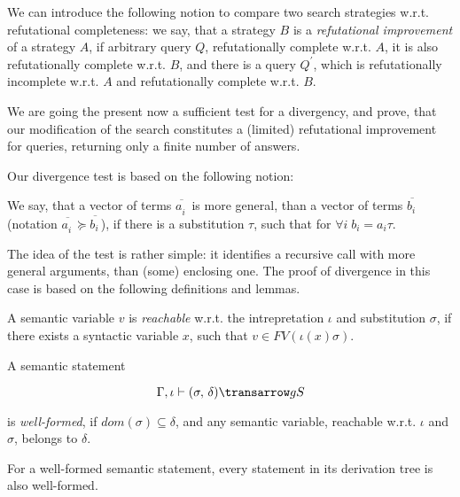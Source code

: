 We can introduce the following notion to compare two search strategies w.r.t. refutational completeness: 
we say, that a strategy $B$ is a \emph{refutational improvement} of a strategy $A$, if arbitrary
query $Q$, refutationally complete w.r.t. $A$, it is also refutationally complete w.r.t. $B$, and there
is a query $Q^\prime$, which is refutationally incomplete w.r.t. $A$ and refutationally complete
w.r.t. $B$. 

We are going the present now a sufficient test for a divergency, and prove, that our modification of
the search constitutes a (limited) refutational improvement for queries, returning only a finite number of answers.

Our divergence test is based on the following notion:

\begin{definition}
\normalfont 
We say, that a vector of terms $\overline{a^{\phantom{x}}_i}$ is more general, than a vector of terms $\overline{b^{\phantom{x}}_i}$ (notation 
$\overline{a^{\phantom{x}}_i}\succeq\overline{b^{\phantom{x}}_i}$), if there is a substitution $\tau$, such that for $\forall i\;b_i = a_i \tau$.
\end{definition}

The idea of the test is rather simple: it identifies a recursive call with more general arguments, 
than (some) enclosing one. The proof of divergence in this case is based on the following definitions and
lemmas.

\begin{definition}
\normalfont
A semantic variable $v$ is \emph{reachable} w.r.t. the intrepretation $\iota$ and substitution $\sigma$, if there exists 
a syntactic variable $x$, such that \mbox{$v \in FV(\iota(x) \sigma)$}.
\end{definition}

\begin{definition}
\normalfont
A semantic statement 

$$
\otrans{\Gamma,\iota}{(\sigma,\,\delta)}{g}{S}
$$ 

\noindent is \emph{well-formed}, if \mbox{$dom(\sigma) \subseteq \delta$}, and any semantic variable, reachable w.r.t. $\iota$ and $\sigma$, belongs to $\delta$.  
\end{definition}

\begin{lemma}
\label{one}
\normalfont
 For a well-formed semantic statement, every statement in its derivation tree is also well-formed.
\end{lemma}

